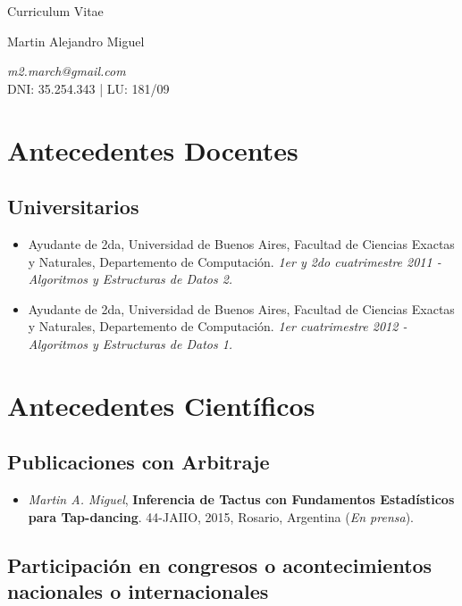 \documentclass[a4paper,10pt]{article}
\begin{document}
\begin{center}
    { \Huge
    Curriculum Vitae}
\bigskip

{\Large Martin Alejandro Miguel} \\
\medskip

\emph{m2.march@gmail.com} \\
DNI: 35.254.343 | LU: 181/09 
\end{center}


\section{Antecedentes Docentes}

\subsection{Universitarios}

\begin{itemize}
    \item Ayudante de 2da, Universidad de Buenos Aires, Facultad de Ciencias
Exactas y Naturales, Departemento de Computación. \emph{1er y 2do cuatrimestre
2011 - 
Algoritmos y Estructuras de Datos 2.}
    \item Ayudante de 2da, Universidad de Buenos Aires, Facultad de Ciencias
Exactas y Naturales, Departemento de Computación. \emph{1er cuatrimestre 2012 -
Algoritmos y Estructuras de Datos 1.}
\end{itemize}

\section{Antecedentes Científicos}

\subsection{Publicaciones con Arbitraje}

\begin{itemize}
    \item 
\emph{Martin A. Miguel}, 
\textbf{Inferencia de Tactus con Fundamentos Estadísticos para Tap-dancing}.
44-JAIIO, 2015, Rosario, Argentina (\emph{En prensa}).
\end{itemize}

\subsection{Participación en congresos o acontecimientos nacionales o
internacionales}
\end{document}
